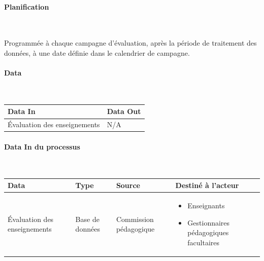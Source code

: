 \documentclass[a4paper,11pt]{report}
\begin{document}
\paragraph{Planification}~\newline{}

Programmée à chaque campagne d'évaluation, après la période de traitement des données, à une date définie dans le calendrier de campagne.

\paragraph{Data}~\newline{}

\begin{tabularx}{\linewidth}{|X|X|} \hline
Data In & Data Out \\ \hline
Évaluation des enseignements & N/A \\ \hline
\end{tabularx}

\paragraph{Data In du processus}~\newline{}

\begin{tabularx}{\linewidth}{|X|X|X|X|} \hline
Data & Type & Source & Destiné à l'acteur \\ \hline
Évaluation des enseignements & Base de données & Commission pédagogique &
\begin{itemize}
	\item Enseignants
	\item Gestionnaires pédagogiques facultaires\newline{}
\end{itemize}
\\ \hline
\end{tabularx}


\end{document}
